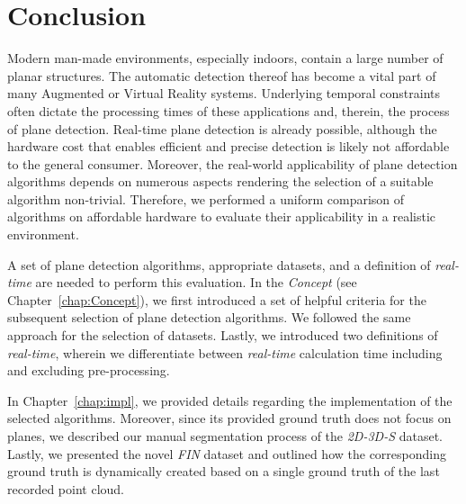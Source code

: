 \documentclass[main.tex]{subfiles}
\begin{document}
\chapter{Conclusion}
\label{chap:concl}

Modern man-made environments, especially indoors, contain a large number of planar structures. The automatic detection thereof has become a vital part of many Augmented or Virtual Reality systems. Underlying temporal constraints often dictate the processing times of these applications and, therein, the process of plane detection. Real-time plane detection is already possible, although the hardware cost that enables efficient and precise detection is likely not affordable to the general consumer. 
Moreover, the real-world applicability of plane detection algorithms depends on numerous aspects rendering the selection of a suitable algorithm non-trivial.
Therefore, we performed a uniform comparison of algorithms on affordable hardware to evaluate their applicability in a realistic environment.

A set of plane detection algorithms, appropriate datasets, and a definition of \textit{real-time} are needed to perform this evaluation. In the \textit{Concept} (see Chapter~\ref{chap:Concept}), we first introduced a set of helpful criteria for the subsequent selection of plane detection algorithms. We followed the same approach for the selection of datasets. Lastly, we introduced two definitions of \textit{real-time}, wherein we differentiate between \textit{real-time} calculation time including and excluding pre-processing.

In Chapter~\ref{chap:impl}, we provided details regarding the implementation of the selected algorithms. Moreover, since its provided ground truth does not focus on planes, we described our manual segmentation process of the \textit{2D-3D-S} dataset. Lastly, we presented the novel \textit{FIN} dataset and outlined how the corresponding ground truth is dynamically created based on a single ground truth of the last recorded point cloud.
\end{document}

